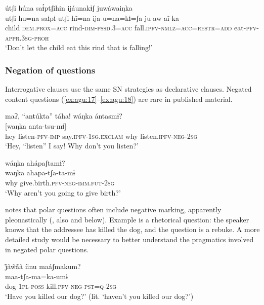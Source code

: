 \documentclass[output=paper,colorlinks,citecolor=brown,draft]{langscibook}
\begin{document}
\ea\label{ex:agu:16}
    \glll útʃi húna saɨ́ptʃihin ijáunakɨʃ juwáwaiŋka \\ 
          utʃi  hu=na  saɨpɨ-utʃi-hĩ=na  ija-u=na=kɨ=ʃa ju-aw-aĩ-ka \\
          child  \textsc{dem}.\textsc{prox}=\textsc{acc}  rind-\textsc{dim-pssd.3=acc}  fall.\textsc{ipfv-nmlz=acc=restr=add} eat-\textsc{pfv-appr.3sg-proh} \\
    \glt ‘Don’t let the child eat this rind that is falling!’ \citep[75]{Overall2017b}
\z 

\subsubsection{Negation of questions}\label{sec:agu:2.2.2}

Interrogative clauses use the same SN strategies as declarative clauses. Negated content questions (\ref{ex:agu:17}--\ref{ex:agu:18}) are rare in published material. 

\ea\label{ex:agu:17}
    \glll maʔ, “antúkta” táha! wáŋka ántasmɨ? \\ 
          [maʔ  antu-ka-ta  ta-ha]  [waŋka  anta-tsu-mɨ] \\
          hey  listen-\textsc{pfv-imp}  say.\textsc{ipfv-1sg.exclam}  why  listen\textsc{.ipfv-neg-2sg} \\
    \glt ‘Hey, “listen” I say! Why don’t you listen?’ \citep[563]{Overall2017a}
\z 

\ea\label{ex:agu:18}
    \glll wáŋka ahápaʃtamɨ? \\ 
          waŋka  ahapa-tʃa-ta-mɨ \\
          why  give.birth.\textsc{pfv-neg-imm.fut-2sg} \\
    \glt ‘Why aren’t you going to give birth?’ \citep[354]{Overall2017a}
\z           

\citet[394]{Overall2017a} notes that polar questions often include negative marking, apparently pleonastically (, also  and  below). Example  is a rhetorical question: the speaker knows that the addressee has killed the dog, and the question is a rebuke. A more detailed study would be necessary to better understand the pragmatics involved in negated polar questions.

\ea\label{ex:agu:19}
    \glll j̃ãw̃ã́ã íinu maáʃmakum? \\ 
          [jawaã  ii-nau]  maa-tʃa-ma=ka-umɨ \\
          dog  \textsc{1pl-poss}  kill.\textsc{pfv-neg-pst=q-2sg} \\
    \glt ‘Have you killed our dog?’ (lit. ‘haven’t you killed our dog?’) \citep[155]{Overall2017a}
\z
\end{document}
